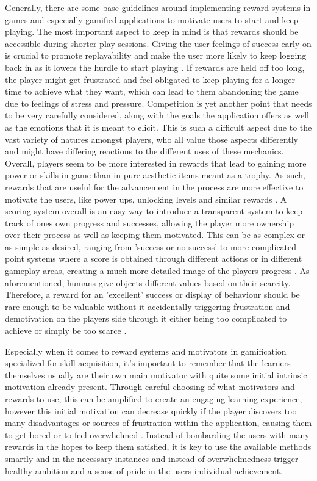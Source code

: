 Generally, there are some base guidelines around implementing reward systems in games and especially gamified applications to motivate users to start and keep playing. The most important aspect to keep in mind is that rewards should be accessible during shorter play sessions. Giving the user feelings of success early on is crucial to promote replayability and make the user more likely to keep logging back in as it lowers the hurdle to start playing \cite{mmo}. If rewards are held off too long, the player might get frustrated and feel obligated to keep playing for a longer time to achieve what they want, which can lead to them abandoning the game due to feelings of stress and pressure.
Competition is yet another point that needs to be very carefully considered, along with the goals the application offers as well as the emotions that it is meant to elicit. This is such a difficult aspect due to the vast variety of natures amongst players, who all value those aspects differently and might have differing reactions to the different uses of these mechanics. Overall, players seem to be more interested in rewards that lead to gaining more power or skills in game than in pure aesthetic items meant as a trophy. As such, rewards that are useful for the advancement in the process are more effective to motivate the users, like power ups, unlocking levels and similar rewards \cite{fail}.
A scoring system overall is an easy way to introduce a transparent system to keep track of ones own progress and successes, allowing the player more ownership over their process as well as keeping them motivated. This can be as complex or as simple as desired, ranging from 'success or no success' to more complicated point systems where a score is obtained through different actions or in different gameplay areas, creating a much more detailed image of the players progress \cite{lifelong}.
As aforementioned, humans give objects different values based on their scarcity. Therefore, a reward for an 'excellent' success or display of behaviour should be rare enough to be valuable without it accidentally triggering frustration and demotivation on the players side through it either being too complicated to achieve or simply be too scarce \cite{lifelong}.

Especially when it comes to reward systems and motivators in gamification specialized for skill acquisition, it's important to remember that the learners themselves usually are their own main motivator with quite some initial intrinsic motivation already present. Through careful choosing of what motivators and rewards to use, this can be amplified to create an engaging learning experience, however this initial motivation can decrease quickly if the player discovers too many disadvantages or sources of frustration within the application, causing them to get bored or to feel overwhelmed \cite{lifelong}. Instead of bombarding the users with many rewards in the hopes to keep them satisfied, it is key to use the available methods smartly and in the necessary instances and instead of overwhelmedness trigger healthy ambition and a sense of pride in the users individual achievement.